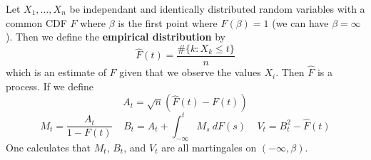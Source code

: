 \begin{example}
    Let $X_1, \dots, X_n$ be independant and identically distributed random variables with a common CDF $F$ where $\beta$ is the first point where $F(\beta) = 1$ (we can have $\beta = \infty$). Then we define the {\bf empirical distribution} by
    \[ \widehat{F}(t) = \frac{\# \{ k : X_k \leq t \}}{n} \]
    which is an estimate of $F$ given that we observe the values $X_i$. Then $\widehat{F}$ is a \cadlag process. If we define
    \[ A_t = \sqrt{n} \left(\widehat{F}(t) - F(t) \right) \]
    \[ M_t = \frac{A_t}{1 - F(t)}\ \ \ \ \ B_t = A_t + \int_{-\infty}^t M_s\ dF(s)\ \ \ \ \ V_t = B_t^2 - \widehat{F}(t) \]
    One calculates that $M_t$, $B_t$, and $V_t$ are all \cadlag martingales on $(-\infty, \beta)$.
\end{example}

